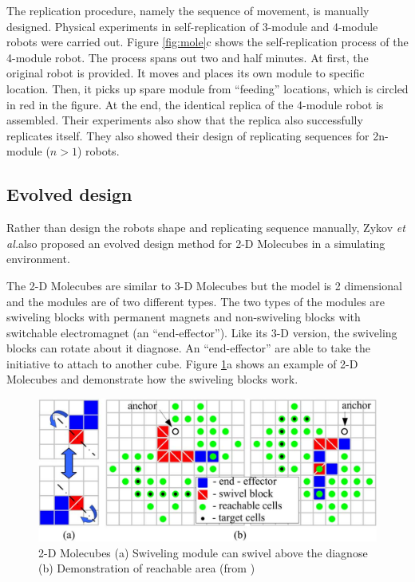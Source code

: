 \documentclass[12pt,twoside]{article}
\theoremstyle{plain}
\theoremstyle{definition}
\theoremstyle{remark}
\newcommand{\etal}{\textit{et al.}}
\begin{document}
The replication procedure, namely the sequence of movement, is manually designed. Physical experiments in self-replication of 3-module and 4-module robots were carried out. Figure \ref{fig:mole}c shows the self-replication process of the 4-module robot. The process spans out two and half minutes. At first, the original robot is provided. It moves and places its own module to specific location. Then, it picks up spare module from ``feeding'' locations, which is circled in red in the figure. At the end, the identical replica of the 4-module robot is assembled. Their experiments also show that the replica also successfully replicates itself. They also showed their design of replicating sequences for 2n-module ($n > 1$) robots. 

\subsection{Evolved design}
Rather than design the robots shape and replicating sequence manually, Zykov \etal also proposed an evolved design method for 2-D Molecubes in a simulating environment\cite{zykov_evolved_2007}.

The 2-D Molecubes are similar to 3-D Molecubes but the model is 2 dimensional and the modules are of two different types. The two types of the modules are swiveling blocks with permanent magnets and non-swiveling blocks with switchable electromagnet (an ``end-effector''). Like its 3-D version, the swiveling blocks can rotate about it diagnose. An ``end-effector'' are able to take the initiative to attach to another cube. Figure \ref{fig:2dmole}a shows an example of 2-D Molecubes and demonstrate how the swiveling blocks work.

\begin{figure}[t]
	 \centerline{\includegraphics[width=.7\textwidth]{zykov-271}}
	 {\caption{2-D Molecubes (a) Swiveling module can swivel above the diagnose (b) Demonstration of reachable area (from \cite{zykov_evolved_2007})}
	 \label{fig:2dmole}}
\end{figure}
\end{document}
